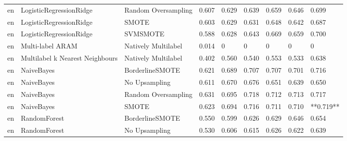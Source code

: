 \begin{tabular}{lllllllll}
      en &         LogisticRegressionRidge &           Random Oversampling & 0.607 &                     0.629 &                 0.639 &                  0.659 &                                   0.646 &     0.699 \\
      en &         LogisticRegressionRidge &                         SMOTE & 0.603 &                     0.629 &                 0.631 &                  0.648 &                                   0.642 &     0.687 \\
      en &         LogisticRegressionRidge &                      SVMSMOTE & 0.588 &                     0.628 &                 0.643 &                  0.669 &                                   0.659 &     0.700 \\
      en &                Multi-label ARAM &           Natively Multilabel & 0.014 &                         0 &                     0 &                      0 &                                       0 &         0 \\
      en & Multilabel k Nearest Neighbours &           Natively Multilabel & 0.402 &                     0.560 &                 0.540 &                  0.553 &                                   0.533 &     0.638 \\
      en &                      NaiveBayes &               BorderlineSMOTE & 0.621 &                     0.689 &                 0.707 &                  0.707 &                                   0.701 &     0.716 \\
      en &                      NaiveBayes &                 No Upsampling & 0.611 &                     0.670 &                 0.676 &                  0.651 &                                   0.639 &     0.650 \\
      en &                      NaiveBayes &           Random Oversampling & 0.631 &                     0.695 &                 0.718 &                  0.712 &                                   0.713 &     0.717 \\
      en &                      NaiveBayes &                         SMOTE & 0.623 &                     0.694 &                 0.716 &                  0.711 &                                   0.710 & **0.719** \\
      en &                    RandomForest &               BorderlineSMOTE & 0.550 &                     0.599 &                 0.626 &                  0.629 &                                   0.646 &     0.654 \\
      en &                    RandomForest &                 No Upsampling & 0.530 &                     0.606 &                 0.615 &                  0.626 &                                   0.622 &     0.639 \\

\end{tabular}
